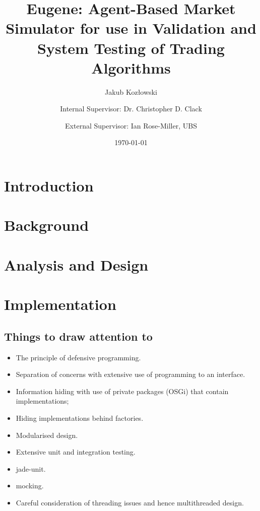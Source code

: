 \documentclass[a4, 11pt, english]{report}
\title{\textbf{Eugene: Agent-Based Market Simulator for use in Validation and System Testing of Trading Algorithms}}
\author{Jakub Kozłowski \and Internal Supervisor: Dr. Christopher D. Clack \and External Supervisor: Ian Rose-Miller, UBS}
\date{\today}
\begin{document}
\maketitle

\tableofcontents

\pagestyle{fancy}

\begin{onehalfspace}

\chapter{Introduction}
\label{introduction}





\chapter{Background}
\label{background}

\chapter{Analysis and Design}
\label{analysis-and-design}




\chapter{Implementation}
\label{implementation}

\section{Things to draw attention to}
\begin{itemize}
\item The principle of defensive programming.
\item Separation of concerns with extensive use of programming to an interface.
\item Information hiding with use of private packages (OSGi) that contain implementations;
\item Hiding implementations behind factories.
\item Modularised design.
\item Extensive unit and integration testing.
\item jade-unit.
\item mocking.
\item Careful consideration of threading issues and hence multithreaded design.


\end{itemize}
\end{onehalfspace}
\end{document}
